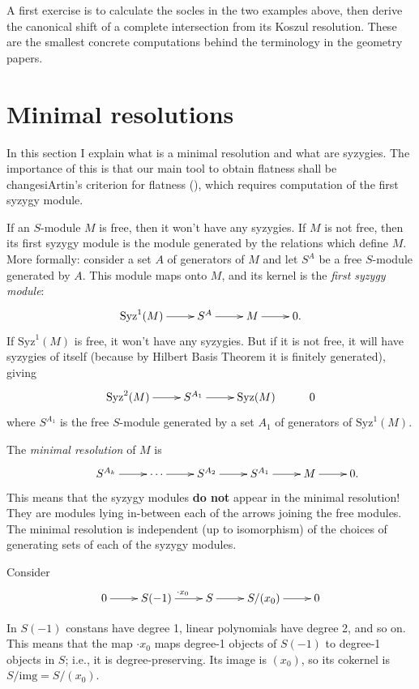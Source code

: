 A first exercise is to calculate the socles
in the two examples above, then derive the
canonical shift of a complete intersection
from its Koszul resolution. These are the
smallest concrete computations behind the
terminology in the geometry papers.

\section{Minimal resolutions}
\label{section-minimal-resolutions}

\noindent
In this section I explain what is a minimal
resolution and what are syzygies. The
importance of this is that our main tool to
obtain flatness shall be changesiArtin's
criterion for flatness (\cite[Theorem
3.15]{Graffeo-Alessi}), which requires
computation of the first syzygy module.

\medskip\noindent
If an $S$-module $M$ is free, then it won't
have any syzygies. If $M$ is not free, then
its first syzygy module is the module
generated by the relations which define  $M$.
More formally: consider a set $A$ of
generators of $M$ and let $S^A$ be a free
$S$-module generated by $A$. This module maps
onto $M$, and its kernel is the {\it first
syzygy module}:
$$
\xymatrix{
\text{Syz}^1(M)\ar[r]
&S^A\ar[r]
&M\ar[r]
&0.
}
$$
If $\text{Syz}^1(M)$ is free, it won't have any syzygies. But if it is not free, it will have syzygies of itself (because by Hilbert Basis Theorem it is finitely generated), giving
$$
\xymatrix{
\text{Syz}^2(M)\ar[r]
&S^{A_1}\ar[r]
&\text{Syz}(M)
&0
}
$$
where $S^{A_1}$ is the free $S$-module
generated by a set $A_1$ of generators of $\text{Syz}^1(M)$.

The {\it minimal resolution} of $M$ is
$$
\xymatrix{
&S^{A_k}\ar[r]
&\cdots\ar[r]
&S^{A_2}\ar[r]
&S^{A_1}\ar[r]
&M\ar[r]
&0.
}
$$
This means that the syzygy modules
{\bf do not} appear in the minimal resolution!
They are modules lying in-between each of the arrows
joining the free modules.
The minimal resolution is independent
(up to isomorphism) of the choices of generating
sets of each of the syzygy modules.

\medskip\noindent
Consider
$$
\xymatrix{
0\ar[r]
&S(-1)\ar[r]^{\cdot x_0}
&S\ar[r]
&S/(x_0)\ar[r]
&0
}
$$

In $S(-1)$ constans have degree 1, linear
polynomials have degree 2, and so on. This
means that the map $\cdot x_0$ maps degree-1
objects of $S(-1)$ to degree-1 objects in
$S$; i.e., it is degree-preserving. Its image
is $(x_0)$, so its cokernel is $S/\text{img}
= S/(x_0)$.

